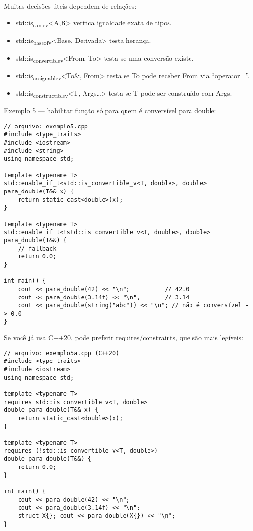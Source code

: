 \documentclass[11pt]{article}
\begin{document}
Muitas decisões úteis dependem de relações:
\begin{itemize}
\item std::is\textsubscript{same}\textsubscript{v}<A,B> verifica igualdade exata de tipos.
\item std::is\textsubscript{base}\textsubscript{of}\textsubscript{v}<Base, Derivada> testa herança.
\item std::is\textsubscript{convertible}\textsubscript{v}<From, To> testa se uma conversão existe.
\item std::is\textsubscript{assignable}\textsubscript{v}<To\&, From> testa se To pode receber From via “operator=”.
\item std::is\textsubscript{constructible}\textsubscript{v}<T, Args\ldots{}> testa se T pode ser construído com Args.
\end{itemize}

Exemplo 5 — habilitar função só para quem é conversível para double:
\begin{verbatim}
// arquivo: exemplo5.cpp
#include <type_traits>
#include <iostream>
#include <string>
using namespace std;

template <typename T>
std::enable_if_t<std::is_convertible_v<T, double>, double>
para_double(T&& x) {
    return static_cast<double>(x);
}

template <typename T>
std::enable_if_t<!std::is_convertible_v<T, double>, double>
para_double(T&&) {
    // fallback
    return 0.0;
}

int main() {
    cout << para_double(42) << "\n";          // 42.0
    cout << para_double(3.14f) << "\n";       // 3.14
    cout << para_double(string("abc")) << "\n"; // não é conversível -> 0.0
}
\end{verbatim}

Se você já usa C++20, pode preferir requires/constraints, que são mais legíveis:
\begin{verbatim}
// arquivo: exemplo5a.cpp (C++20)
#include <type_traits>
#include <iostream>
using namespace std;

template <typename T>
requires std::is_convertible_v<T, double>
double para_double(T&& x) {
    return static_cast<double>(x);
}

template <typename T>
requires (!std::is_convertible_v<T, double>)
double para_double(T&&) {
    return 0.0;
}

int main() {
    cout << para_double(42) << "\n";
    cout << para_double(3.14f) << "\n";
    struct X{}; cout << para_double(X{}) << "\n";
}
\end{verbatim}
\end{document}
